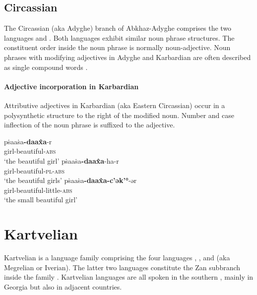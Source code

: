 \subsection{Circassian}
The Circassian (aka Adyghe) branch of Abkhaz-Adyghe comprises the two languages  and . Both languages exhibit similar noun phrase structures. The constituent order inside the noun phrase is normally noun-adjective. Noun phrases with modifying adjectives in Adyghe and Karbardian are often described as single compound words \citep[222]{comrie1981}.

\paragraph*{Adjective incorporation in Karbardian}
Attributive adjectives in Karbardian (aka Eastern Circassian) occur in a polysynthetic structure to the right of the modified noun. Number and case inflection of the noun phrase is suffixed to the adjective.
\begin{exe}
\begin{xlist}
\ex	
\gll	pṡaaṡa\textbf{-daax̂a}-r\\
	girl-beautiful-\textsc{abs}\\
\glt	‘the beautiful girl’
\ex
\gll	pṡaaṡa\textbf{-daax̂a}-ha-r\\
	girl-beautiful-\textsc{pl}-\textsc{abs}\\
\glt	‘the beautiful girls’
\ex
\gll	pṡaaṡa\textbf{-daax̂a-c'ək'°}-ər\\
	girl-beautiful-little-\textsc{abs}\\
\glt	‘the small beautiful girl’
\end{xlist}
\end{exe}

\section{Kartvelian}
\label{kartvelian synchr}
Kartvelian is a language family comprising the four languages , ,  and  (aka Megrelian or Iverian). The latter two languages constitute the Zan subbranch inside the family \citep[220]{salminen2007}. Kartvelian languages are all spoken in the southern , mainly in Georgia but also in adjacent countries.

